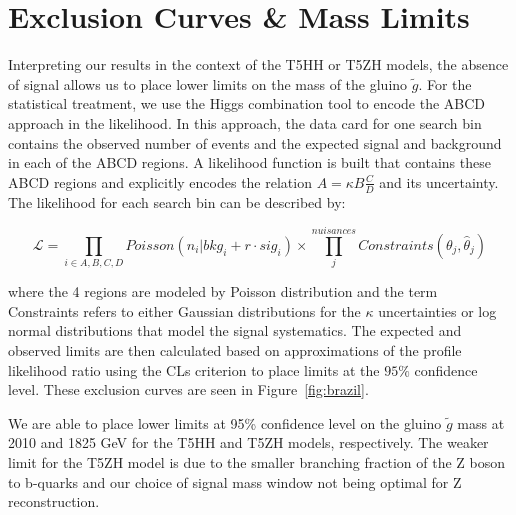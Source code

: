 \section{Exclusion Curves \& Mass Limits}

Interpreting our results in the context of the T5HH or T5ZH models, the absence of signal allows us to place lower limits on the mass of the gluino $\tilde{g}$. For the statistical treatment, we use the Higgs combination tool to encode the ABCD approach in the likelihood. In this approach, the data card for one search bin contains the observed number of events and the expected signal and background in each of the ABCD regions. A likelihood function is built that contains these ABCD regions and explicitly encodes the relation $A=\kappa B \frac{C}{D}$ and its uncertainty. The likelihood for each search bin can be described by:

\begin{equation}
\mathcal{L}=\prod_{i\in A,B,C,D} Poisson\left(n_i \vert bkg_i + r\cdot sig_i\right) \times \prod^{nuisances}_j Constraints\left(\theta_j , \hat{\theta}_j\right)
\end{equation}

where the 4 regions are modeled by Poisson distribution and the term Constraints refers to either Gaussian distributions for the $\kappa$ uncertainties or log normal distributions that model the signal systematics. The expected and observed limits are then calculated based on approximations of the profile likelihood ratio using the CLs criterion to place limits at the $95\%$ confidence level. These exclusion curves are seen in Figure~\ref{fig:brazil}.

We are able to place lower limits at 95\% confidence level on the gluino $\tilde{g}$ mass at 2010 and 1825 GeV for the T5HH and T5ZH models, respectively. The weaker limit for the T5ZH model is due to the smaller branching fraction of the Z boson to b-quarks and our choice of signal mass window not being optimal for Z reconstruction.

